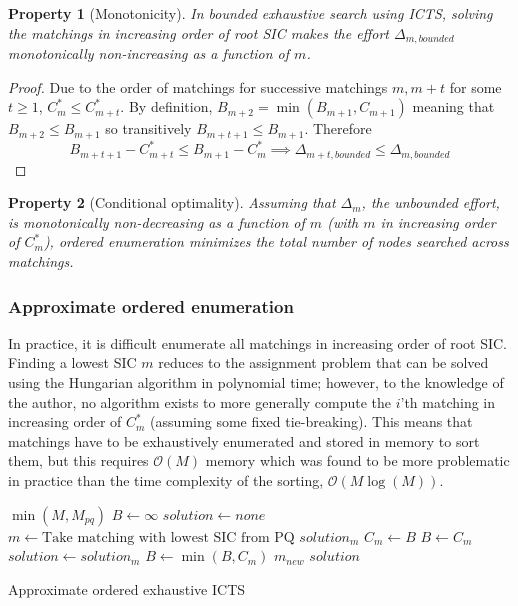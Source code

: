 \documentclass[english,10pt]{article}
\newtheorem{property}{Property}
\begin{document}
	\begin{property}[Monotonicity]
		\label{monotonicity}
		In bounded exhaustive search using ICTS, solving the matchings in increasing order of root SIC makes the effort $\Delta_{m,bounded}$ monotonically non-increasing as a function of $m$.
	\end{property}
	\begin{proof}
		Due to the order of matchings for successive matchings $m,m+t$ for some $t\geq 1$, $C^*_{m} \leq C^*_{m+t}$. By definition, $B_{m+2} = \min(B_{m+1},C_{m+1})$ meaning that $B_{m+2} \leq B_{m + 1}$ so transitively $B_{m+t+1} \leq B_{m+1}$. Therefore
		\[B_{m+t+1} - C^*_{m+t}\leq B_{m+1} - C^*_m\implies \Delta_{m+t,bounded} \leq \Delta_{m,bounded}\]
	\end{proof}
	\begin{property}[Conditional optimality]
	\label{cond-monoton-optim}
	Assuming that $\Delta_m$, the unbounded effort, is monotonically non-decreasing as a function of $m$ (with $m$ in increasing order of $C^*_m$), ordered enumeration minimizes the total number of nodes searched across matchings.
	\end{property}
	\subsubsection{Approximate ordered enumeration}
	In practice, it is difficult enumerate all matchings in increasing order of root SIC. Finding a lowest SIC $m$ reduces to the assignment problem that can be solved using the Hungarian algorithm \cite{kuhn55} in polynomial time; however, to the knowledge of the author, no algorithm exists to more generally compute the $i$'th matching in increasing order of $C^*_m$ (assuming some fixed tie-breaking). This means that matchings have to be exhaustively enumerated and stored in memory to sort them, but this requires $\mathcal{O}(M)$ memory which was found to be more problematic in practice than the time complexity of the sorting, $\mathcal{O}(M\log(M))$.
	
		\begin{algorithm}
		\begin{algorithmic}[1]
			\State {}$\min(M,M_{pq})$
			\State $B \gets \infty$
			\State $solution \gets none$
			\Repeat
			\State $m\gets\text{Take matching with lowest SIC from PQ}$
			\State $solution_m$  $C_m\gets$$B$ 
			\State $B\gets C_m$
			\State $solution \gets solution_m$
			\EndIf
			\State $B\gets\min(B,C_m)$
			\State {}$m_{new}$
			\EndIf
			\Return $solution$
		\end{algorithmic}
		\caption{Approximate ordered exhaustive ICTS} 
		\label{pq-algo}
	\end{algorithm}
\end{document}
